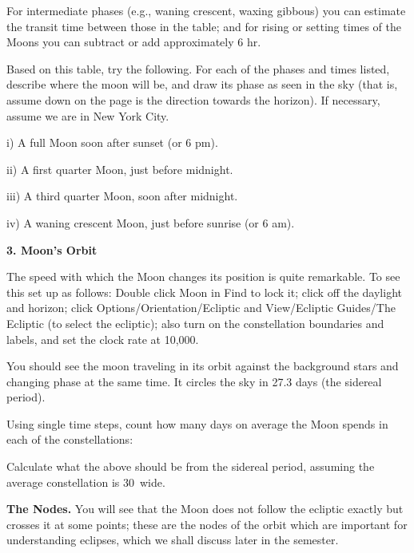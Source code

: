 \noindent For intermediate phases (e.g., waning crescent, waxing gibbous) you
can estimate the transit time between those in the table; and for
rising or setting times of the Moons you can subtract or add
approximately 6 hr.

\bigskip
\noindent
Based on this table, try the following. For each of the phases and
times listed, describe where the moon will be, and draw its phase as
seen in the sky (that is, assume down on the page is the direction
towards the horizon). If necessary, assume we are in New York City.

\medskip
i) A full Moon soon after sunset (or 6 pm). 

\centerline{}


ii) A first quarter Moon, just before midnight.

\centerline{}

iii) A third quarter Moon, soon after midnight.

\centerline{}

iv) A waning crescent Moon, just before sunrise (or 6 am).

\centerline{}

\vspace{9cm}

\bigskip
\noindent
{\bf 3. Moon's Orbit}

\medskip\noindent The speed with which the Moon changes its position
is quite remarkable. To see this set up as follows: Double click Moon
in Find to lock it; click off the daylight and horizon; click
Options/Orientation/Ecliptic and View/Ecliptic Guides/The Ecliptic (to
select the ecliptic); also turn on the constellation boundaries and
labels, and set the clock rate at 10,000.

\noindent You should see the moon traveling in its orbit against the background
stars and changing phase at the same time. It circles the sky in 27.3
days (the sidereal period).

\medskip
Using single time steps, count how many days on average the Moon
spends in each of the constellations: \makebox[2cm]{\hrulefill}

\medskip
Calculate what the above should be from the sidereal period, assuming
the average constellation is 30\deg\ wide.  \makebox[2cm]{\hrulefill}

\medskip\noindent
{\bf The Nodes.}  You will see that the Moon does not follow the ecliptic exactly but crosses it
at some points; these are the nodes of the orbit which are important
for understanding eclipses, which we shall discuss later in the
semester.

